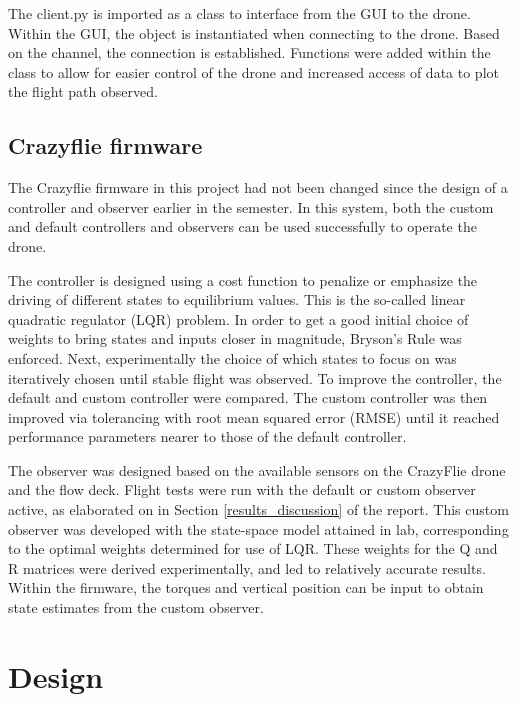 \documentclass[conf]{new-aiaa}
\begin{document}
        The client.py is imported as a class to interface from the GUI to the drone. Within the GUI, the object is instantiated when connecting to the drone. Based on the channel, the connection is established. Functions were added within the class to allow for easier control of the drone and increased access of data to plot the flight path observed. 
    
    \subsection{Crazyflie firmware}
        The Crazyflie firmware in this project had not been changed since the design of a controller and observer earlier in the semester. In this system, both the custom and default controllers and observers can be used successfully to operate the drone.
        
        The controller is designed using a cost function to penalize or emphasize the driving of different states to equilibrium values. This is the so-called linear quadratic regulator (LQR) problem. In order to get a good initial choice of weights to bring states and inputs closer in magnitude, Bryson's Rule was enforced. Next, experimentally the choice of which states to focus on was iteratively chosen until stable flight was observed. To improve the controller, the default and custom controller were compared. The custom controller was then improved via tolerancing with root mean squared error (RMSE) until it reached performance parameters nearer to those of the default controller.
        
        The observer was designed based on the available sensors on the CrazyFlie drone and the flow deck. Flight tests were run with the default or custom observer active, as elaborated on in Section \ref{results_discussion} of the report. This custom observer was developed with the state-space model attained in lab, corresponding to the optimal weights determined for use of LQR. These weights for the Q and R matrices were derived experimentally, and led to relatively accurate results. Within the firmware, the torques and vertical position can be input to obtain state estimates from the custom observer. 


\section{Design}
\end{document}
